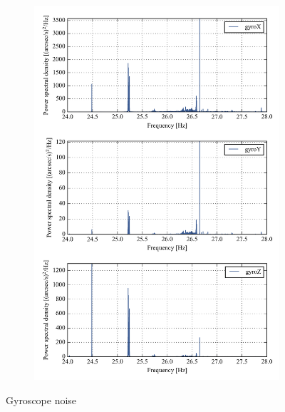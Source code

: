 \begin{landscape}
\begin{figure}[!h]
\begin{subfigure}[b]{0.7\textwidth}
\vspace{-0.5cm}
	\caption{}
	\label{fig:multiPSD400}
	\end{subfigure}
\begin{subfigure}[b]{0.7\textwidth}
		\centering
\includegraphics[width=\textwidth]{Figures/multiPSD_no_loglog_zoom_400.png}

\vspace{-0.5cm}
\caption{}
\label{fig:multiPSD400_no_loglog_zoom_400}
	\end{subfigure}
	\vspace{-0.5cm}
\caption[Gyroscope noise]{Gyroscope noise}
\end{figure}
\end{landscape}



